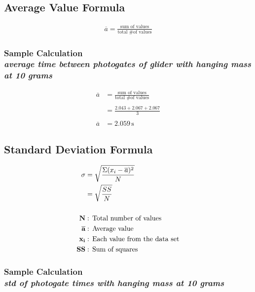 
\subsection{Average Value Formula} 

\begin{align*}
	\overline{a} = \frac{\text{sum of values}}{\text{total \# of values}} 
\end{align*}

\subsubsection{Sample Calculation \\ {\normalfont \small\textit{average time between photogates of glider with hanging mass at 10 grams }}}


\begin{align*}
	\overline{a}&=\frac{\text{sum of values}}{\text{total \# of values}} \\ \\
							&= \frac{2.043+2.067+2.067}{3} \\ \\
	\overline{a}&= \boxed{2.059\,\text{s}}
\end{align*}

\subsection{Standard Deviation Formula}

\begin{align*}
		\sigma &= \sqrt{\frac{\Sigma(x_i -\overline{a})^2}{N}} \\
		 &= \sqrt{\frac{SS}{N}} \\ \\
		\textbf{N} &:\, \text{Total number of values} \\
		\overline{\textbf{a}} &:\, \text{Average value} \\
		\textbf{x\textsubscript{i}} &:\, \text{Each value from the data set} \\
		\textbf{SS} &:\, \text{Sum of squares} 
\end{align*}

\subsubsection{Sample Calculation \\ {\normalfont \small\textit{std of photogate times with hanging mass at 10 grams }}}


